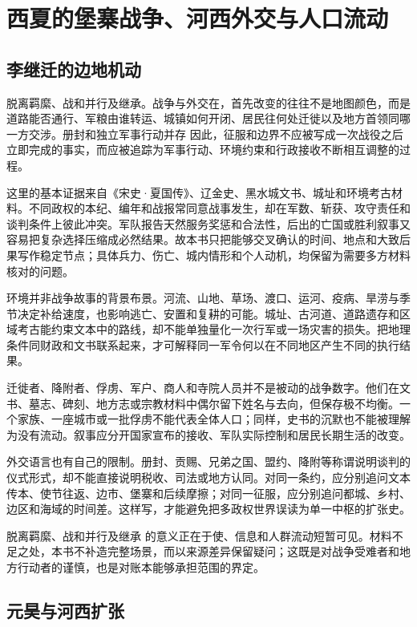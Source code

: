 \section{西夏的堡寨战争、河西外交与人口流动}

\subsection{李继迁的边地机动}

脱离羁縻、战和并行及继承。战争与外交在，首先改变的往往不是地图颜色，而是道路能否通行、军粮由谁转运、城镇如何开闭、居民往何处迁徙以及地方首领同哪一方交涉。册封和独立军事行动并存 因此，征服和边界不应被写成一次战役之后立即完成的事实，而应被追踪为军事行动、环境约束和行政接收不断相互调整的过程。

这里的基本证据来自《宋史·夏国传》、辽金史、黑水城文书、城址和环境考古材料。不同政权的本纪、编年和战报常同意战事发生，却在军数、斩获、攻守责任和谈判条件上彼此冲突。军队报告天然服务奖惩和合法性，后出的亡国或胜利叙事又容易把复杂选择压缩成必然结果。故本书只把能够交叉确认的时间、地点和大致后果写作稳定节点；具体兵力、伤亡、城内情形和个人动机，均保留为需要多方材料核对的问题。

环境并非战争故事的背景布景。河流、山地、草场、渡口、运河、疫病、旱涝与季节决定补给速度，也影响逃亡、安置和复耕的可能。城址、古河道、道路遗存和区域考古能约束文本中的路线，却不能单独量化一次行军或一场灾害的损失。把地理条件同财政和文书联系起来，才可解释同一军令何以在不同地区产生不同的执行结果。

迁徙者、降附者、俘虏、军户、商人和寺院人员并不是被动的战争数字。他们在文书、墓志、碑刻、地方志或宗教材料中偶尔留下姓名与去向，但保存极不均衡。一个家族、一座城市或一批俘虏不能代表全体人口；同样，史书的沉默也不能被理解为没有流动。叙事应分开国家宣布的接收、军队实际控制和居民长期生活的改变。

外交语言也有自己的限制。册封、贡赐、兄弟之国、盟约、降附等称谓说明谈判的仪式形式，却不能直接说明税收、司法或地方认同。对同一条约，应分别追问文本传本、使节往返、边市、堡寨和后续摩擦；对同一征服，应分别追问都城、乡村、边区和海域的时间差。这样写，才能避免把多政权世界误读为单一中枢的扩张史。

脱离羁縻、战和并行及继承 的意义正在于使、信息和人群流动短暂可见。材料不足之处，本书不补造完整场景，而以来源差异保留疑问；这既是对战争受难者和地方行动者的谨慎，也是对账本能够承担范围的界定。

\subsection{元昊与河西扩张}

